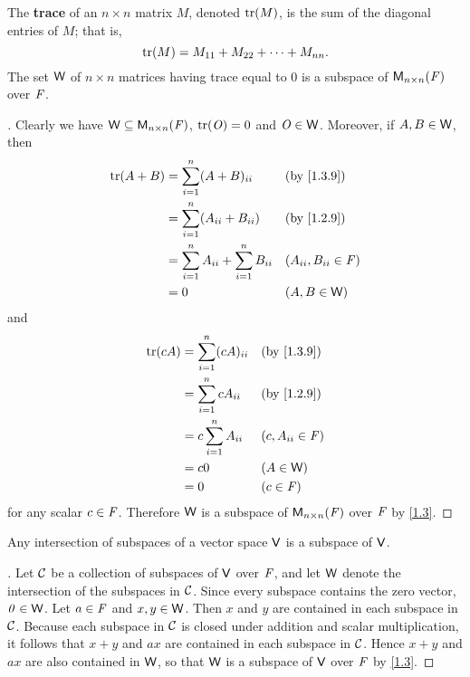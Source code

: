 \begin{eg}\label{1.3.9}
	The \textbf{trace} of an \(n \times n\) matrix \(M\), denoted \(\tr[M]\), is the sum of the diagonal entries of \(M\);
	that is,
	\[
		\tr[M] = M_{1 1} + M_{2 2} + \dots + M_{n n}.
	\]
	The set \(\mathsf{W}\) of \(n \times n\) matrices having trace equal to \(0\) is a subspace of \(\mathsf{M}_{{n} \times n}({\mathit{F}})\) over \(\mathit{F}\).
\end{eg}

\begin{proof}[]
	Clearly we have \(\mathsf{W} \subseteq \mathsf{M}_{{n} \times n}({\mathit{F}})\), \(\tr[\zm] = 0\) and \(\mathit{O} \in \mathsf{W}\).
	Moreover, if \(A, B \in \mathsf{W}\), then
	\begin{align*}
		\tr[A + B] & = \sum_{i = 1}^n (A + B)_{i i}                    &  & \by{1.3.9}                \\
		           & = \sum_{i = 1}^n (A_{i i} + B_{i i})              &  & \by{1.2.9}                \\
		           & = \sum_{i = 1}^n A_{i i} + \sum_{i = 1}^n B_{i i} &  & (A_{i i}, B_{i i} \in \F) \\
		           & = 0                                               &  & (A, B \in \W)
	\end{align*}
	and
	\begin{align*}
		\tr[cA] & = \sum_{i = 1}^n (cA)_{i i} &  & \by{1.3.9}          \\
		        & = \sum_{i = 1}^n cA_{i i}   &  & \by{1.2.9}          \\
		        & = c \sum_{i = 1}^n A_{i i}  &  & (c, A_{i i} \in \F) \\
		        & = c0                        &  & (A \in \W)          \\
		        & = 0                         &  & (c \in \F)
	\end{align*}
	for any scalar \(c \in \mathit{F}\).
	Therefore \(\mathsf{W}\) is a subspace of \(\mathsf{M}_{{n} \times n}({\mathit{F}})\) over \(\mathit{F}\) by \cref{1.3}.
\end{proof}

\begin{thm}\label{1.4}
	Any intersection of subspaces of a vector space \(\mathsf{V}\) is a subspace of \(\mathsf{V}\).
\end{thm}

\begin{proof}[]
	Let \(\mathcal{C}\) be a collection of subspaces of \(\mathsf{V}\) over \(\mathit{F}\), and let \(\mathsf{W}\) denote the intersection of the subspaces in \(\mathcal{C}\).
	Since every subspace contains the zero vector, \(\mathit{0} \in \mathsf{W}\).
	Let \(a \in \mathit{F}\) and \(x, y \in \mathsf{W}\).
	Then \(x\) and \(y\) are contained in each subspace in \(\mathcal{C}\).
	Because each subspace in \(\mathcal{C}\) is closed under addition and scalar multiplication, it follows that \(x + y\) and \(ax\) are contained in each subspace in \(\mathcal{C}\).
	Hence \(x + y\) and \(ax\) are also contained in \(\mathsf{W}\), so that \(\mathsf{W}\) is a subspace of \(\mathsf{V}\) over \(\mathit{F}\) by \cref{1.3}.
\end{proof}

